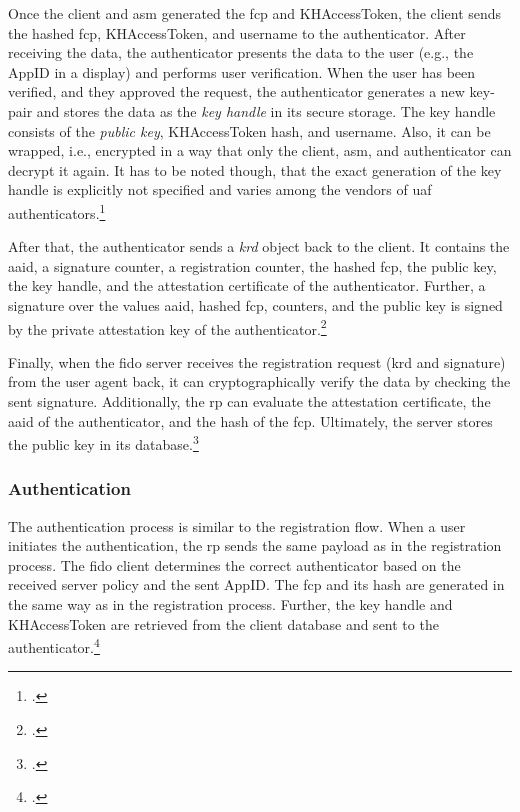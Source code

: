Once the client and \gls{asm} generated the \gls{fcp} and KHAccessToken, the client sends the hashed \gls{fcp}, KHAccessToken, and username to the authenticator. After receiving the data, the authenticator presents the data to the user (e.g., the AppID in a display) and performs user verification. When the user has been verified, and they approved the request, the authenticator generates a new key-pair and stores the data as the \textit{key handle} in its secure storage. The key handle consists of the \textit{public key}, KHAccessToken hash, and username. Also, it can be wrapped, i.e., encrypted in a way that only the client, \gls{asm}, and authenticator can decrypt it again. It has to be noted though, that the exact generation of the key handle is explicitly not specified and varies among the vendors of \gls{uaf} authenticators.\footcites[See][9, 16--17]{uaf-asm}

 After that, the authenticator sends a \textit{\gls{krd}} object back to the client. It contains the \gls{aaid}, a signature counter, a registration counter, the hashed \gls{fcp}, the public key, the key handle, and the attestation certificate of the authenticator. Further, a signature over the values \gls{aaid}, hashed \gls{fcp}, counters, and the public key is signed by the private attestation key of the authenticator.\footcites[See][12--13]{analysis_fido_master_thesis}[See][22]{uaf-protocol}[See][17]{uaf-auth-commands}

Finally, when the \gls{fido} server receives the registration request (\gls{krd} and signature) from the user agent back, it can cryptographically verify the data by checking the sent signature. Additionally, the \gls{rp} can evaluate the attestation certificate, the \gls{aaid} of the authenticator, and the hash of the \gls{fcp}. Ultimately, the server stores the public key in its database.\footcites[See][192--193]{7897543}[See][23]{uaf-protocol}

\subsubsection{Authentication}

The authentication process is similar to the registration flow. When a user initiates the authentication, the \gls{rp} sends the same payload as in the registration process. The \gls{fido} client determines the correct authenticator based on the received server policy and the sent AppID. The \gls{fcp} and its hash are generated in the same way as in the registration process. Further, the key handle and KHAccessToken are retrieved from the client database and sent to the authenticator.\footcites[See][132--133]{10.1007/978-3-319-67639-5_11}

